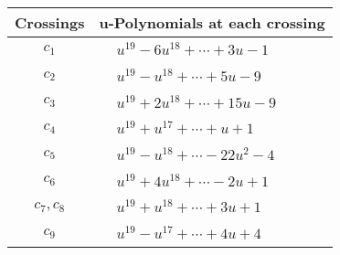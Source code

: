 \documentclass[1p]{elsarticle_modified}
\theoremstyle{definition}
\begin{document}
\begin{tabular}{m{50pt}|m{274pt}}
Crossings & \hspace{64pt}u-Polynomials at each crossing \\
\hline $$\begin{aligned}c_{1}\end{aligned}$$&$\begin{aligned}
&u^{19}-6 u^{18}+\cdots+3 u-1
\end{aligned}$\\
\hline $$\begin{aligned}c_{2}\end{aligned}$$&$\begin{aligned}
&u^{19}- u^{18}+\cdots+5 u-9
\end{aligned}$\\
\hline $$\begin{aligned}c_{3}\end{aligned}$$&$\begin{aligned}
&u^{19}+2 u^{18}+\cdots+15 u-9
\end{aligned}$\\
\hline $$\begin{aligned}c_{4}\end{aligned}$$&$\begin{aligned}
&u^{19}+u^{17}+\cdots+u+1
\end{aligned}$\\
\hline $$\begin{aligned}c_{5}\end{aligned}$$&$\begin{aligned}
&u^{19}- u^{18}+\cdots-22 u^2-4
\end{aligned}$\\
\hline $$\begin{aligned}c_{6}\end{aligned}$$&$\begin{aligned}
&u^{19}+4 u^{18}+\cdots-2 u+1
\end{aligned}$\\
\hline $$\begin{aligned}c_{7},c_{8}\end{aligned}$$&$\begin{aligned}
&u^{19}+u^{18}+\cdots+3 u+1
\end{aligned}$\\
\hline $$\begin{aligned}c_{9}\end{aligned}$$&$\begin{aligned}
&u^{19}- u^{17}+\cdots+4 u+4
\end{aligned}$\\

\end{tabular}
\end{document}
